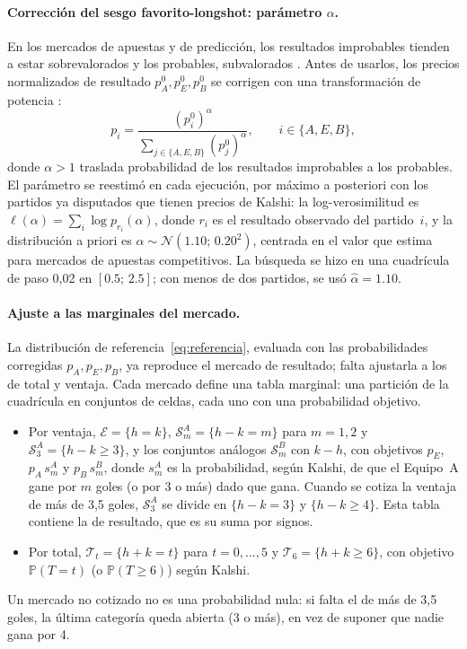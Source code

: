 \documentclass[12pt]{article}
\theoremstyle{plain}
\theoremstyle{remark}
\newcommand{\Prob}{\mathbb{P}}
\begin{document}
\paragraph{Corrección del sesgo favorito-longshot: parámetro $\alpha$.}
\label{sec:alpha}
En los mercados de apuestas y de predicción, los resultados
improbables tienden a estar sobrevalorados y los probables,
subvalorados \citep{whelan2024, burgi2026}.
Antes de usarlos, los precios normalizados de resultado
$p_A^0, p_E^0, p_B^0$ se corrigen con una transformación de potencia
\citep{whelan2024, burgi2026}:
\begin{equation}
  p_i = \frac{(p_i^0)^\alpha}{\sum_{j \in \{A, E, B\}} (p_j^0)^\alpha},
  \qquad i \in \{A, E, B\},
  \label{eq:alpha}
\end{equation}
donde $\alpha > 1$ traslada probabilidad de los resultados improbables
a los probables.
El parámetro se reestimó en cada ejecución, por máximo a posteriori
con los partidos ya disputados que tienen precios de Kalshi: la log-verosimilitud es
$\ell(\alpha) = \sum_i \log p_{r_i}(\alpha)$, donde $r_i$ es el
resultado observado del partido~$i$, y la distribución a priori es
$\alpha \sim \mathcal{N}(1.10;\, 0.20^2)$, centrada en el valor que
\citet{whelan2024} estima para mercados de apuestas competitivos.
La búsqueda se hizo en una cuadrícula de paso 0,02 en $[0.5;\, 2.5]$;
con menos de dos partidos, se usó $\hat\alpha = 1.10$.

\paragraph{Ajuste a las marginales del mercado.}
\label{sec:ipf}
La distribución de referencia~\eqref{eq:referencia}, evaluada con las
probabilidades corregidas $p_A, p_E, p_B$, ya reproduce el mercado de
resultado; falta ajustarla a los de total y ventaja.
Cada mercado define una tabla marginal: una partición de la
cuadrícula en conjuntos de celdas, cada uno con una probabilidad
objetivo.
\begin{itemize}
  \item Por ventaja, $\mathcal{E} = \{h = k\}$, $\mathcal{S}^A_m =
    \{h - k = m\}$ para $m = 1, 2$ y $\mathcal{S}^A_3 = \{h - k \geq
    3\}$, y los conjuntos análogos $\mathcal{S}^B_m$ con $k - h$, con
    objetivos $p_E$, $p_A\, s^A_m$ y $p_B\, s^B_m$, donde $s^A_m$ es la
    probabilidad, según Kalshi, de que el Equipo~A gane por $m$ goles
    (o por 3 o más) dado que gana.
    Cuando se cotiza la ventaja de más de 3,5 goles, $\mathcal{S}^A_3$
    se divide en $\{h - k = 3\}$ y $\{h - k \geq 4\}$.
    Esta tabla contiene la de resultado, que es su suma por signos.
  \item Por total, $\mathcal{T}_t = \{h + k = t\}$ para
    $t = 0, \ldots, 5$ y $\mathcal{T}_6 = \{h + k \geq 6\}$, con
    objetivo $\Prob(T = t)$ (o $\Prob(T \geq 6)$) según Kalshi.
\end{itemize}
Un mercado no cotizado no es una probabilidad nula: si falta el de
más de 3,5 goles, la última categoría queda abierta (3 o más), en vez
de suponer que nadie gana por 4.
\end{document}
